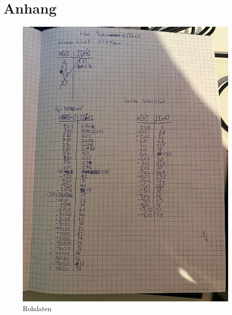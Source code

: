 

\subject{V500}
\title{}
\date{%
  Durchführung:
  \hspace{3em}
  Abgabe:
}



\maketitle
\thispagestyle{empty}
\tableofcontents
\newpage






\printbibliography{}

\section{Anhang}
\begin{figure}[H]
  \includegraphics[width=\textwidth]{Bilder/Rohdaten1.jpg}
  \caption{Rohdaten}
\end{figure}
